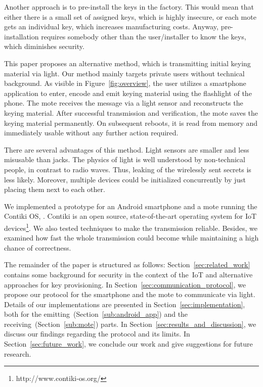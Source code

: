 \documentclass{sig-alternate} %
\begin{document}
Another approach is to pre-install the keys in the factory.
This would mean that either there is a small set of assigned keys, which is highly insecure, or each mote gets an individual key, which increases manufacturing costs.
Anyway, pre-installation requires somebody other than the user/installer to know the keys, which diminishes security.

This paper proposes an alternative method, which is transmitting initial keying material via light.
Our method mainly targets private users without technical background.
As visible in Figure~\ref{fig:overview}, the user utilizes a smartphone application to enter, encode and emit keying material using the flashlight of the phone.
The mote receives the message via a light sensor and reconstructs the keying material.
After successful transmission and verification, the mote saves the keying material permanently.
On subsequent reboots, it is read from memory and immediately usable without any further action required.

There are several advantages of this method.
Light sensors are smaller and less misusable than jacks.
The physics of light is well understood by non-technical people, in contrast to radio waves.
Thus, leaking of the wirelessly sent secrets is less likely.
Moreover, multiple devices could be initialized concurrently by just placing them next to each other.

We implemented a prototype for an Android smartphone and a mote running the Contiki OS, \cite{dunkels04contiki}.
Contiki is an open source, state-of-the-art operating system for IoT devices\footnote{http://www.contiki-os.org/}.
We also tested techniques to make the transmission reliable.
Besides, we examined how fast the whole transmission could become while maintaining a high chance of correctness.

The remainder of the paper is structured as follows:
Section~\ref{sec:related_work} contains some background for security in the context of the~IoT and alternative approaches for key provisioning.
In Section~\ref{sec:communication_protocol}, we propose our protocol for the smartphone and the mote to communicate via light.
Details of our implementations are presented in Section~\ref{sec:implementation}, both for the emitting~(Section~\ref{sub:android_app}) and the receiving~(Section~\ref{sub:mote}) parts.
In Section~\ref{sec:results_and_discussion}, we discuss our findings regarding the protocol and its limits.
In Section~\ref{sec:future_work}, we conclude our work and give suggestions for future research.
\end{document}
